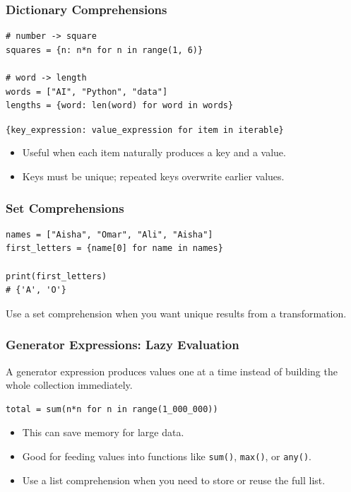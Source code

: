 \documentclass[aspectratio=169,10pt]{beamer}
\newcommand{\code}[1]{\texttt{#1}}
\newenvironment{bluebox}[1]{%
  \vspace{0.08cm}\begin{tcolorbox}[lecturebox,title={#1},fontupper=\small]%
}{\end{tcolorbox}\vspace{0.05cm}}
\begin{document}
\begin{frame}[fragile]
\frametitle{Dictionary Comprehensions}
\begin{lstlisting}[style=py]
# number -> square
squares = {n: n*n for n in range(1, 6)}

# word -> length
words = ["AI", "Python", "data"]
lengths = {word: len(word) for word in words}
\end{lstlisting}
\begin{bluebox}{Pattern}
\texttt{\{key\_expression: value\_expression for item in iterable\}}
\end{bluebox}
\begin{itemize}
  \item Useful when each item naturally produces a key and a value.
  \item Keys must be unique; repeated keys overwrite earlier values.
\end{itemize}
\end{frame}

\begin{frame}[fragile]
\frametitle{Set Comprehensions}
\begin{lstlisting}[style=py]
names = ["Aisha", "Omar", "Ali", "Aisha"]
first_letters = {name[0] for name in names}

print(first_letters)
# {'A', 'O'}
\end{lstlisting}
\begin{bluebox}{When useful?}
Use a set comprehension when you want unique results from a transformation.
\end{bluebox}
\end{frame}

\begin{frame}[fragile]
\frametitle{Generator Expressions: Lazy Evaluation}
\begin{bluebox}{Key idea}
A generator expression produces values one at a time instead of building the whole collection immediately.
\end{bluebox}
\begin{lstlisting}[style=py]
total = sum(n*n for n in range(1_000_000))
\end{lstlisting}
\begin{itemize}
  \item This can save memory for large data.
  \item Good for feeding values into functions like \code{sum()}, \code{max()}, or \code{any()}.
  \item Use a list comprehension when you need to store or reuse the full list.
\end{itemize}
\end{frame}
\end{document}
